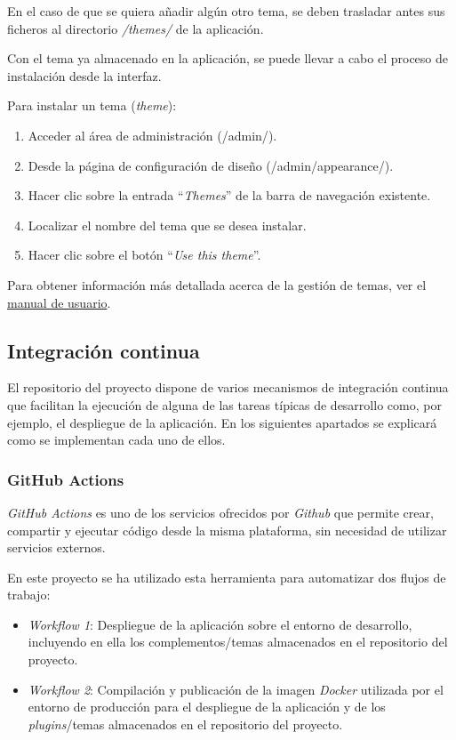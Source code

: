 En el caso de que se quiera añadir algún otro tema, se deben trasladar
antes sus ficheros al directorio \emph{/themes/} de la aplicación.

Con el tema ya almacenado en la aplicación, se puede llevar a cabo el
proceso de instalación desde la interfaz.

Para instalar un tema (\emph{theme}):

\begin{enumerate}
\def\labelenumi{\arabic{enumi}.}
\tightlist
\item
  Acceder al área de administración ({/admin/}).
\item
  Desde la página de configuración de diseño
  ({/admin/appearance/}).
\item
  Hacer clic sobre la entrada ``\emph{Themes}'' de la barra de navegación
  existente.
\item
  Localizar el nombre del tema que se desea instalar.
\item
  Hacer clic sobre el botón ``\emph{Use this theme}''.
\end{enumerate}

Para obtener información más detallada acerca de la gestión de temas,
ver el
\href{https://tfg-ceniehariadne.readthedocs.io/es/latest/anexos/E_Manual_usuario.html\#manual-de-usuario}{manual
de usuario}.

\subsection{Integración continua}

El repositorio del proyecto dispone de varios mecanismos de integración
continua que facilitan la ejecución de alguna de las tareas típicas de
desarrollo como, por ejemplo, el despliegue de la aplicación. En los
siguientes apartados se explicará como se implementan cada uno de ellos.

\subsubsection{GitHub Actions}

\emph{GitHub Actions} es uno de los servicios ofrecidos por
\emph{Github} que permite crear, compartir y ejecutar código desde la
misma plataforma, sin necesidad de utilizar servicios externos.

En este proyecto se ha utilizado esta herramienta para automatizar dos
flujos de trabajo:

\begin{itemize}
\tightlist
\item
  \emph{Workflow 1}: Despliegue de la aplicación sobre el entorno de
  desarrollo, incluyendo en ella los complementos/temas almacenados en
  el repositorio del proyecto.
\item
  \emph{Workflow 2}: Compilación y publicación de la imagen
  \emph{Docker} utilizada por el entorno de producción para el
  despliegue de la aplicación y de los \emph{plugins}/temas almacenados
  en el repositorio del proyecto.
\end{itemize}

